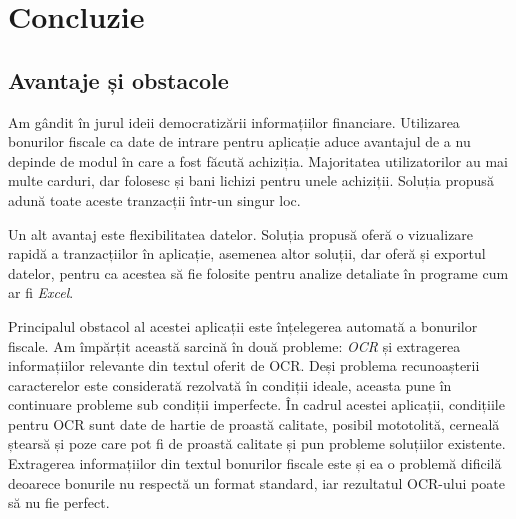\chapter{Concluzie}\label{conclusions}

\section{Avantaje și obstacole}\label{avantaje_obstacole_intro}

Am gândit \AppName{} în jurul ideii democratizării informațiilor financiare. Utilizarea bonurilor fiscale ca date de intrare pentru aplicație aduce avantajul de a nu depinde de modul în care a fost făcută achiziția. Majoritatea utilizatorilor au mai multe carduri, dar folosesc și bani lichizi pentru unele achiziții. Soluția propusă adună toate aceste tranzacții într-un singur loc.

Un alt avantaj este flexibilitatea datelor. Soluția propusă oferă o vizualizare rapidă a tranzacțiilor în aplicație, asemenea altor soluții, dar oferă și exportul datelor, pentru ca acestea să fie folosite pentru analize detaliate în programe cum ar fi \emph{Excel}.

Principalul obstacol al acestei aplicații este înțelegerea automată a bonurilor fiscale. Am împărțit această sarcină în două probleme: \emph{OCR} și extragerea informațiilor relevante din textul oferit de OCR. Deși problema recunoașterii caracterelor este considerată rezolvată în condiții ideale, aceasta pune în continuare probleme sub condiții imperfecte. În cadrul acestei aplicații, condițiile pentru OCR sunt date de hartie de proastă calitate, posibil mototolită, cerneală ștearsă și poze care pot fi de proastă calitate și pun probleme soluțiilor existente. Extragerea informațiilor din textul bonurilor fiscale este și ea o problemă dificilă deoarece bonurile nu respectă un format standard, iar rezultatul OCR-ului poate să nu fie perfect. 
